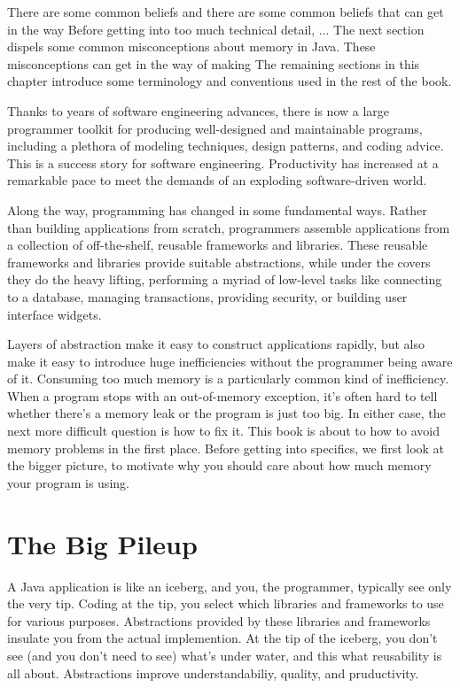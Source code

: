 There are some common beliefs and there are some common beliefs that can get in the way 
Before getting into too much technical detail, ... The next section dispels some common misconceptions about memory in Java.  These misconceptions can get in the way of making  The remaining sections in this chapter introduce some terminology and conventions used in the rest of the book.

Thanks to years of software engineering advances, there is now a large
programmer toolkit for producing well-designed and maintainable programs,
including a plethora of modeling techniques, design patterns, and coding 
advice. This is a success story for software engineering. Productivity has
increased at a remarkable pace to meet the demands of an exploding software-driven world. 

Along the way, programming has changed in some fundamental ways. Rather than building applications from scratch, programmers 
assemble applications from a collection of off-the-shelf, reusable frameworks
and libraries. These reusable frameworks and libraries provide suitable
abstractions, while under the covers they do the heavy lifting, performing a
myriad of low-level tasks like connecting to a database, managing transactions,
providing security, or building user interface widgets.

Layers of abstraction make it easy to construct applications
rapidly, but also make it easy to introduce huge inefficiencies without the
programmer being aware of it. Consuming too much memory is a particularly common
kind of inefficiency. When a program stops with an out-of-memory exception, it's
often hard to tell whether there's a memory leak or the program is just too big. 
In either case, the next more difficult
question is how to fix it. This book is about to how to avoid memory problems in the first place. Before
getting into specifics, we first look at the bigger picture, to motivate
why you should care about how much memory your program is using.


\section{The Big Pileup}

A Java application is like an iceberg, and you, the programmer, typically see
only the very tip. Coding at the tip, you select which libraries
and frameworks to use for various purposes. Abstractions provided by these
libraries and frameworks insulate you from the actual implemention. At the tip
of the iceberg, you don't see (and you don't need to see) what's under water,
and this what reusability is all about. Abstractions improve understandabiliy, quality, and
pruductivity. 

